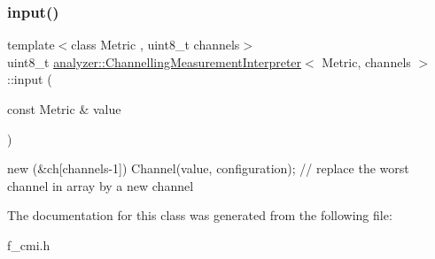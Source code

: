 \subsubsection{\texorpdfstring{input()}{input()}}
{\footnotesize\ttfamily template$<$class Metric , uint8\+\_\+t channels$>$ \\
uint8\+\_\+t \mbox{\hyperlink{classanalyzer_1_1_channelling_measurement_interpreter}{analyzer\+::\+Channelling\+Measurement\+Interpreter}}$<$ Metric, channels $>$\+::input (\begin{DoxyParamCaption}\item[{const Metric \&}]{value }\end{DoxyParamCaption})}

new (\&ch\mbox{[}channels-\/1\mbox{]}) Channel(value, configuration); // replace the worst channel in array by a new channel 

The documentation for this class was generated from the following file\+:\begin{DoxyCompactItemize}
\item 
f\+\_\+cmi.\+h\end{DoxyCompactItemize}
